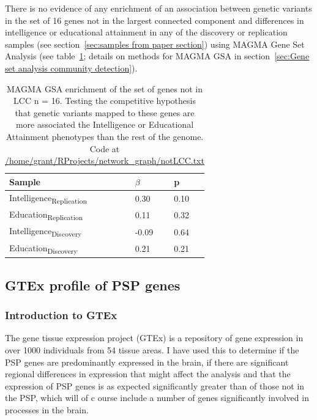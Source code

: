 There is no evidence of any enrichment of an association between genetic variants in the set of 16 genes not in the largest connected component and differences in intelligence or educational attainment in any of the discovery or replication samples (see section~\ref{sec:samples from paper section}) using  MAGMA Gene Set Analysis (see table~\ref{tab:notLCC}; details on methods for MAGMA GSA in section~\ref{sec:Gene set analysis community detection}).

\begin{table}[]
    \centering
    \begin{tabular}{lll}
    \toprule
     Sample   & $\beta$ & p  \\
     \midrule
     Intelligence\textsubscript{Replication} & 0.30 & 0.10\\
     Education\textsubscript{Replication} & 0.11 & 0.32\\
    Intelligence\textsubscript{Discovery} & -0.09 & 0.64\\
    Education\textsubscript{Discovery} & 0.21 & 0.21 \\
    \bottomrule
    \end{tabular}
    \caption[MAGMA GSA for network vertices not in largest connected component]{MAGMA GSA enrichment of the set of genes not in LCC n = 16. Testing the competitive hypothesis that genetic variants mapped to these genes are more associated the Intelligence or Educational Attainment phenotypes than the rest of the genome. Code at \url{/home/grant/RProjects/network_graph/notLCC.txt}}
    \label{tab:notLCC}
\end{table}


\subsection{GTEx profile of PSP genes}
\label{sec:gtex profile of PSP genes}
\subsubsection{Introduction to GTEx}
The gene tissue expression project (GTEx) is a repository of gene expression in over 1000 individuals from 54 tissue areas\cite{lek2016analysis}. I have used this to determine if the PSP genes are predominantly expressed in the brain, if there are significant regional differences in expression that might affect the analysis and that the expression of PSP genes is as expected significantly greater than of those not in the PSP, which will of c
ourse include a number of genes significantly involved in processes in the brain. 

